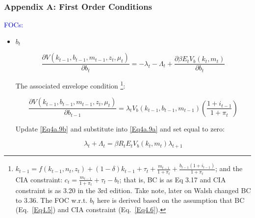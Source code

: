 \begin{frame}
\frametitle{Appendix A: First Order Conditions} \vskip 0.1in
\textcolor{blue}{FOCs:}

{\footnotesize{

\begin{itemize}
\item $b_{t}$

\begin{equation}\label{Eq4a.9a}
\frac{\partial V(k_{t-1}, b_{t-1}, m_{t-1}, z_{t},
\mu_{t})}{\partial b_{t}} = -\lambda_{t} - \Lambda_{t} +
\frac{\partial \beta E_{t} V_{b}(k_{t}, m_{t})}{\partial b_{t}}
\end{equation}

The associated envelope condition
\footnote{$k_{t-1}=f(k_{t-1},n_{t},z_{t})+(1-\delta)k_{t-1}+\tau_{t}+\frac{m_{t-1}}{1+\pi_{t}}
+\frac{b_{t-1}(1+i_{t-1})}{1+\pi_{t}}$; and the CIA constraint:
$c_{t} = \frac{m_{t-1}}{1+\pi_{t}} + \tau_{t} - b_{t}$; that is, BC
is as Eq 3.17 and CIA constraint is as 3.20 in the 3rd edition. Take
note, later on Walsh changed BC to 3.36. The FOC w.r.t. $b_{t}$ here
is derived based on the assumption that BC (Eq.~\ref{Eq4.5}) and CIA
constraint (Eq.~\ref{Eq4.6}).}:

\begin{equation}\label{Eq4a.9b}
\frac{\partial V(k_{t-1}, b_{t-1}, m_{t-1}, z_{t},
\mu_{t})}{\partial b_{t-1}} = \lambda_{t}V_{b}(k_{t-1}, b_{t-1},
m_{t-1})(\frac{1+i_{t-1}}{1+\pi_{t}})
\end{equation}

Update \eqref{Eq4a.9b} and substitute into \eqref{Eq4a.9a} and set
equal to zero:

\begin{equation}\label{Eq4a.9c}
\lambda_{t} + \Lambda_{t} = \beta R_{t} E_{t} V_{b} (k_{t}, m_{t})
\lambda_{t+1}
\end{equation}


\end{itemize}
}}

\end{frame}

